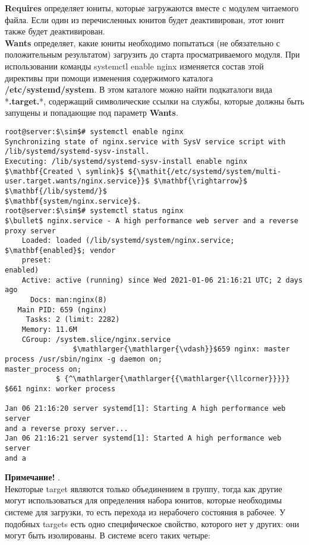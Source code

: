 \documentclass[14pt, a4paper]{article}
\begin{document}
\textbf{Requires} определяет юниты, которые загружаются вместе с модулем читаемого файла. Если один из
перечисленных юнитов будет деактивирован, этот юнит также будет деактивирован.\\

\textbf{Wants} определяет, какие юниты необходимо попытаться (не обязательно с положительным
результатом) загрузить до старта просматриваемого модуля. При использовании команды 
\colorbox{backcolour}{systemctl enable nginx} изменяется состав этой директивы при помощи изменения содержимого каталога
\textbf{/etc/systemd/system}. В этом каталоге можно найти подкаталоги вида *\textbf{.target.}*, содержащий
символические ссылки на службы, которые должны быть запущены и попадающие под параметр
\textbf{Wants}.

\vspace{0.3cm}

\begin{lstlisting}
root@server:$\sim$# systemctl enable nginx
Synchronizing state of nginx.service with SysV service script with
/lib/systemd/systemd-sysv-install.
Executing: /lib/systemd/systemd-sysv-install enable nginx
$\mathbf{Created \ symlink}$ ${\mathit{/etc/systemd/system/multi-user.target.wants/nginx.service}}$ $\mathbf{\rightarrow}$ $\mathbf{/lib/systemd/}$
$\mathbf{system/nginx.service}$.
root@server:$\sim$# systemctl status nginx
$\bullet$ nginx.service - A high performance web server and a reverse proxy server
    Loaded: loaded (/lib/systemd/system/nginx.service; $\mathbf{enabled}$; vendor
    preset:
enabled)
    Active: active (running) since Wed 2021-01-06 21:16:21 UTC; 2 days ago
      Docs: man:nginx(8)
   Main PID: 659 (nginx)
     Tasks: 2 (limit: 2282)
    Memory: 11.6M
    CGroup: /system.slice/nginx.service
                $\mathlarger{\mathlarger{\vdash}}$659 nginx: master process /usr/sbin/nginx -g daemon on;
master_process on;
            $ {^\mathlarger{\mathlarger{{\mathlarger{\llcorner}}}}} $661 nginx: worker process

Jan 06 21:16:20 server systemd[1]: Starting A high performance web server 
and a reverse proxy server...
Jan 06 21:16:21 server systemd[1]: Started A high performance web server 
and a
\end{lstlisting}
\vspace{0.4cm}

\textbf{Примечание!} .\\

Некоторые target являются только объединением в группу, тогда как другие могут использоваться для
определения набора юнитов, которые необходимы системе для  загрузки, то есть перехода
из нерабочего состояния в рабочее. У подобных targets есть одно специфическое свойство, которого
нет у других: они могут быть изолированы. В системе всего таких четыре:
\end{document}
